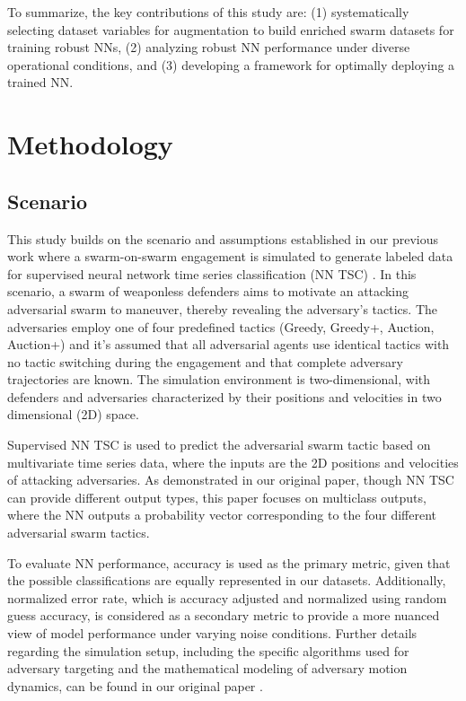 \documentclass[journal]{IEEEtran} %
\begin{document}
To summarize, the key contributions of this study are: (1) systematically selecting dataset variables for augmentation to build enriched swarm datasets for training robust NNs, (2) analyzing robust NN performance under diverse operational conditions, and (3) developing a framework for optimally deploying a trained NN.



\section{Methodology}



\subsection{Scenario}


This study builds on the scenario and assumptions established in our previous work where a swarm-on-swarm engagement is simulated to generate labeled data for supervised neural network time series classification (NN TSC) \cite{peltier_swarm_2024}. In this scenario, a swarm of weaponless defenders aims to motivate an attacking adversarial swarm to maneuver, thereby revealing the adversary's tactics. The adversaries employ one of four predefined tactics (Greedy, Greedy+, Auction, Auction+) and it's assumed that all adversarial agents use identical tactics with no tactic switching during the engagement and that complete adversary trajectories are known. The simulation environment is two-dimensional, with defenders and adversaries characterized by their positions and velocities in two dimensional (2D) space. 

Supervised NN TSC is used to predict the adversarial swarm tactic based on multivariate time series data, where the inputs are the 2D positions and velocities of attacking adversaries. As demonstrated in our original paper, though NN TSC can provide different output types, this paper focuses on multiclass outputs, where the NN outputs a probability vector corresponding to the four different adversarial swarm tactics.

To evaluate NN performance, accuracy is used as the primary metric, given that the possible classifications are equally represented in our datasets. Additionally, normalized error rate, which is accuracy adjusted and normalized using random guess accuracy, is considered as a secondary metric to provide a more nuanced view of model performance under varying noise conditions. Further details regarding the simulation setup, including the specific algorithms used for adversary targeting and the mathematical modeling of adversary motion dynamics, can be found in our original paper \cite{peltier_swarm_2024}.
\end{document}

